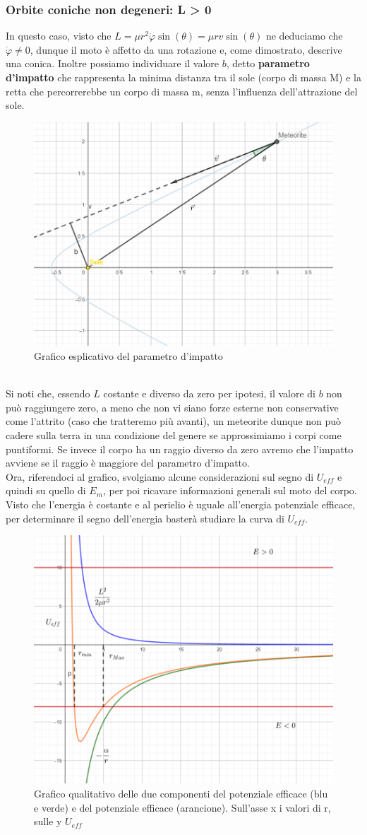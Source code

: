 \documentclass[10pt,a4paper]{article}
\begin{document}
\subsubsection*{Orbite coniche non degeneri: L > 0}
In questo caso, visto che $L = \mu r^2 \dot{\varphi} \sin(\theta) =  \mu r v \sin(\theta) $ ne deduciamo che $\dot{\varphi}\neq 0$, dunque il moto è affetto da una rotazione e, come dimostrato, descrive una conica. Inoltre possiamo individuare il valore $b$, detto \textbf{parametro d'impatto} che rappresenta la minima distanza tra il sole (corpo di massa M) e la retta che percorrerebbe un corpo di massa m, senza l'influenza dell'attrazione del sole.
\begin{figure}[h!]
	\centering
	\includegraphics[width=0.5\linewidth]{meteorite}
	\caption{Grafico esplicativo del parametro d'impatto}
	\label{fig:meteorite}
\end{figure}\\
Si noti che, essendo $L$ costante e diverso da zero per ipotesi, il valore di $b$ non può raggiungere zero, a meno che non vi siano forze esterne non conservative come l'attrito (caso che tratteremo più avanti), un meteorite dunque non può cadere sulla terra in una condizione del genere se approssimiamo i corpi come puntiformi. Se invece il corpo ha un raggio diverso da zero avremo che l'impatto avviene se il raggio è maggiore del parametro d'impatto.\\
Ora, riferendoci al grafico, svolgiamo alcune considerazioni sul segno di $U_{eff}$ e quindi su quello di $E_m$, per poi ricavare informazioni generali sul moto del corpo. Visto che l'energia è costante e al perielio è uguale all'energia potenziale efficace, per determinare il segno dell'energia basterà studiare la curva di $U_{eff}$.\\
\begin{figure}[h!]
	\centering
	\includegraphics[width=0.5\linewidth]{potenziale_efficace}
	\caption{Grafico qualitativo delle due componenti del potenziale efficace (blu e verde) e del potenziale efficace (arancione). Sull'asse x i valori di r, sulle y $U_{eff}$}
	\label{fig:potenzialeefficace}
\end{figure}\\
\end{document}
